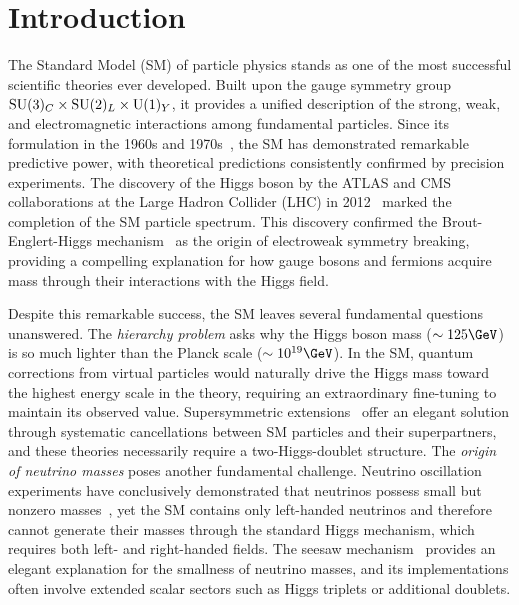 \chapter{Introduction}
\label{ch:Introduction}

The Standard Model (SM) of particle physics stands as one of the most successful scientific theories ever developed. Built upon the gauge symmetry group $\mathrm{SU}(3)_C \times \mathrm{SU}(2)_L \times \mathrm{U}(1)_Y$, it provides a unified description of the strong, weak, and electromagnetic interactions among fundamental particles. Since its formulation in the 1960s and 1970s~\cite{Glashow:1961tr,Weinberg:1967tq,Salam:1968rm}, the SM has demonstrated remarkable predictive power, with theoretical predictions consistently confirmed by precision experiments. The discovery of the Higgs boson by the ATLAS and CMS collaborations at the Large Hadron Collider (LHC) in 2012~\cite{ATLAS:2012yda,CMS:2012qbp} marked the completion of the SM particle spectrum. This discovery confirmed the Brout-Englert-Higgs mechanism~\cite{Englert:1964et,Higgs:1964pj} as the origin of electroweak symmetry breaking, providing a compelling explanation for how gauge bosons and fermions acquire mass through their interactions with the Higgs field.

Despite this remarkable success, the SM leaves several fundamental questions unanswered. The \textit{hierarchy problem} asks why the Higgs boson mass ($\sim 125\GeV$) is so much lighter than the Planck scale ($\sim 10^{19}\GeV$). In the SM, quantum corrections from virtual particles would naturally drive the Higgs mass toward the highest energy scale in the theory, requiring an extraordinary fine-tuning to maintain its observed value. Supersymmetric extensions~\cite{Martin:1997ns} offer an elegant solution through systematic cancellations between SM particles and their superpartners, and these theories necessarily require a two-Higgs-doublet structure. The \textit{origin of neutrino masses} poses another fundamental challenge. Neutrino oscillation experiments have conclusively demonstrated that neutrinos possess small but nonzero masses~\cite{SuperK:1998kpq,SNO:2002tuh}, yet the SM contains only left-handed neutrinos and therefore cannot generate their masses through the standard Higgs mechanism, which requires both left- and right-handed fields. The seesaw mechanism~\cite{Minkowski:1977sc,Mohapatra:1979ia} provides an elegant explanation for the smallness of neutrino masses, and its implementations often involve extended scalar sectors such as Higgs triplets or additional doublets.

